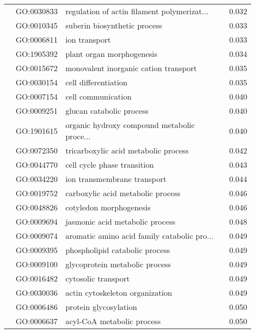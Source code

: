 \begin{longtable}{lllr}
   & GO:0030833 &  regulation of actin filament polymerizat... &         0.032 \\
   & GO:0010345 &                 suberin biosynthetic process &         0.033 \\
   & GO:0006811 &                                ion transport &         0.033 \\
   & GO:1905392 &                    plant organ morphogenesis &         0.034 \\
   & GO:0015672 &        monovalent inorganic cation transport &         0.035 \\
   & GO:0030154 &                         cell differentiation &         0.035 \\
   & GO:0007154 &                           cell communication &         0.040 \\
   & GO:0009251 &                     glucan catabolic process &         0.040 \\
   & GO:1901615 &  organic hydroxy compound metabolic proce... &         0.040 \\
   & GO:0072350 &         tricarboxylic acid metabolic process &         0.042 \\
   & GO:0044770 &                  cell cycle phase transition &         0.043 \\
   & GO:0034220 &                  ion transmembrane transport &         0.044 \\
   & GO:0019752 &            carboxylic acid metabolic process &         0.046 \\
   & GO:0048826 &                      cotyledon morphogenesis &         0.046 \\
   & GO:0009694 &              jasmonic acid metabolic process &         0.048 \\
   & GO:0009074 &  aromatic amino acid family catabolic pro... &         0.049 \\
   & GO:0009395 &               phospholipid catabolic process &         0.049 \\
   & GO:0009100 &               glycoprotein metabolic process &         0.049 \\
   & GO:0016482 &                          cytosolic transport &         0.049 \\
   & GO:0030036 &              actin cytoskeleton organization &         0.049 \\
   & GO:0006486 &                        protein glycosylation &         0.050 \\
   & GO:0006637 &                   acyl-CoA metabolic process &         0.050 \\

\end{longtable}
